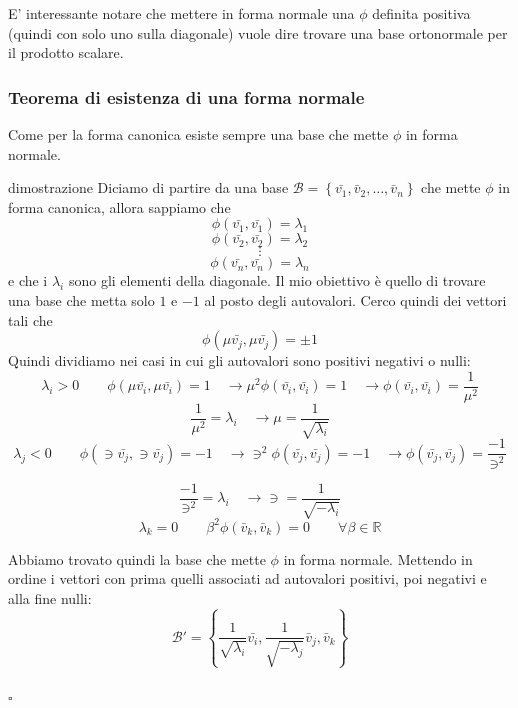 \documentclass[x11names]{article}
\newcommand*{\QEDB}{\null\nobreak\hfill\ensuremath{\square}}%
\begin{document}
\noindent
E' interessante notare che mettere in forma normale una $\phi$ definita positiva (quindi con solo uno sulla diagonale) vuole dire trovare una base ortonormale per il prodotto scalare.

\begin{center}
	\colorbox{myred}{\begin{minipage}{5.75in}
			\begin{redes}{}
				\subsubsection{Teorema di esistenza di una forma normale}
				Come per la forma canonica esiste sempre una base che mette $\phi$ in forma normale.
			\end{redes}
	\end{minipage}}        
\end{center}


\begin{es}{dimostrazione}
	Diciamo di partire da una base $\mathcal{B} = \left\{\bar{v_{1}},\bar{v}_{2},\dots,\bar{v}_{n}\right\}$ che mette $\phi$ in forma canonica, allora sappiamo che 
	\[
	\phi(\bar{v_{1}},\bar{v_{1}}) = \lambda_1
	\]
	\[
	\phi(\bar{v_{2}},\bar{v_{2}}) = \lambda_2
	\]
	\[
	\vdots
	\]
	\[
	\phi(\bar{v_{n}},\bar{v_{n}}) = \lambda_n
	\]
	e che i $\lambda_i$ sono gli elementi della diagonale. Il mio obiettivo è quello di trovare una base che metta solo $1$ e $-1$ al posto degli autovalori. Cerco quindi dei vettori tali che
	\[
	\phi(\mu\bar{ v_{j}},\mu\bar{ v_{j}}) = \pm 1
	\]
	Quindi dividiamo nei casi in cui gli autovalori sono positivi negativi o nulli:
	\[
	\lambda_i > 0 \qquad  \phi(\mu\bar{v_{i}},\mu\bar{v_{i}}) =  1 \quad \to \mu^2\phi(\bar{v_{i}},\bar{v_{i}}) =  1 \quad \to \phi(\bar{v_{i}},\bar{v_{i}}) =  \frac{1}{\mu^2}
	\]
	\[
	\frac{1}{\mu^2} = \lambda_i \quad \to \mu = \frac{1}{\sqrt{\lambda_i}}
	\]
	\[
	\lambda_j < 0 \qquad  \phi(\ni\bar{v_{j}},\ni\bar{v_{j}}) =  -1 \quad \to \ni^2\phi(\bar{v_{j}},\bar{v_{j}}) =  -1 \quad \to \phi(\bar{v_{j}},\bar{v_{j}}) =  \frac{-1}{\ni^2}
	\]
\end{es}
\begin{es}{}
	\[
	\frac{-1}{\ni^2} = \lambda_i \quad \to \ni = \frac{1}{\sqrt{-\lambda_i}}
	\]
	\[
	\lambda_k = 0 \qquad \beta^2\phi(\bar{v}_{k},\bar{v}_{k}) = 0 \qquad \forall \beta \in \mathbb{R}
	\]
	
	Abbiamo trovato quindi la base che mette $\phi$ in forma normale. Mettendo in ordine i vettori con prima quelli associati ad autovalori positivi, poi negativi e alla fine nulli:
	\[
	\mathcal{B}' = \left\{\frac{1}{\sqrt{\lambda_i}}\bar{v_{i}},\frac{1}{\sqrt{-\lambda_j}}\bar{v}_{j},\bar{v}_{k}\right\}
	\]
	\\
	\QEDB
\end{es}
\end{document}
